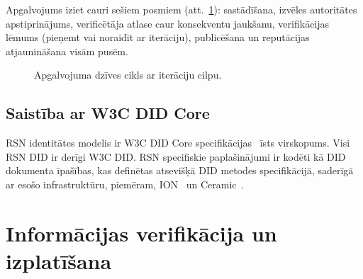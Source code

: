 \documentclass[11pt,a4paper,twocolumn]{article}
\begin{document}
Apgalvojums iziet cauri sešiem posmiem (att.~\ref{fig:lifecycle}): sastādīšana, izvēles autoritātes apstiprinājums, verificētāja atlase caur konsekventu jaukšanu, verifikācijas lēmums (pieņemt vai noraidīt ar iterāciju), publicēšana un reputācijas atjaunināšana visām pusēm.

\begin{figure}[ht]
\centering
{}
\caption{Apgalvojuma dzīves cikls ar iterāciju cilpu.}
\label{fig:lifecycle}
\end{figure}

\subsection{Saistība ar W3C DID Core}

RSN identitātes modelis ir W3C DID Core specifikācijas~\cite{did2022} īsts virskopums. Visi RSN DID ir derīgi W3C DID. RSN specifiskie paplašinājumi ir kodēti kā DID dokumenta īpašības, kas definētas atsevišķā DID metodes specifikācijā, saderīgā ar esošo infrastruktūru, piemēram, ION~\cite{buchner2021} un Ceramic~\cite{ceramic2023}.

\section{Informācijas verifikācija un izplatīšana}
\end{document}
